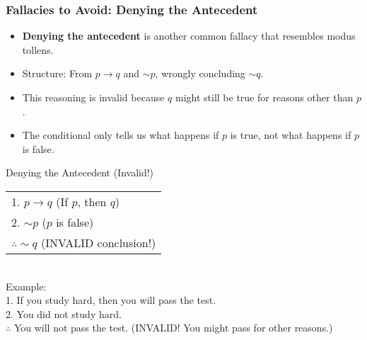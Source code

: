 \documentclass{beamer}
\begin{document}
                                \begin{frame}
                                \frametitle{Fallacies to Avoid: Denying the Antecedent}
                                \begin{itemize}
                                    \item \textbf{Denying the antecedent} is another common fallacy that resembles modus tollens.
                                    \item Structure: From $p \rightarrow q$ and $\sim p$, wrongly concluding $\sim q$.
                                    \item This reasoning is invalid because $q$ might still be true for reasons other than $p$.
                                    \item The conditional only tells us what happens if $p$ is true, not what happens if $p$ is false.
                                \end{itemize}
                                
                                \begin{block}{Denying the Antecedent (Invalid!)}
                                    \scriptsize
                                \begin{tabular}{l}
                                1. $p \rightarrow q$ \hspace{1cm} (If $p$, then $q$) \\
                                2. $\sim p$ \hspace{1.7cm} ($p$ is false) \\
                                \hline
                                $\therefore \sim q$ \hspace{1.4cm} (INVALID conclusion!)
                                \end{tabular}\\[0.3cm]
                                Example:\\
                                1. If you study hard, then you will pass the test.\\
                                2. You did not study hard.\\
                                $\therefore$ You will not pass the test. (INVALID! You might pass for other reasons.)
                                \end{block}
                                \end{frame}
                                
\end{document}
